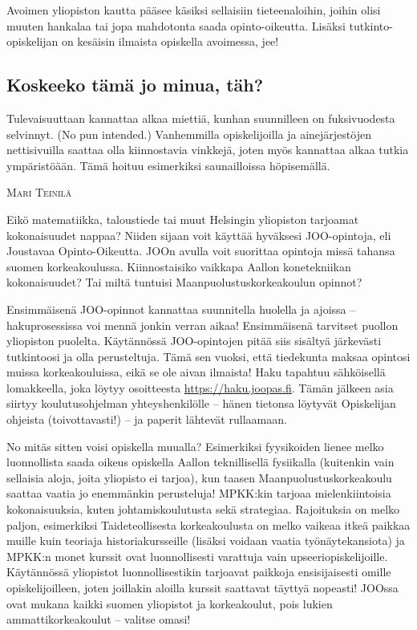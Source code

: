 \documentclass[a5paper, 8pt, twocolumn]{book} %
\numberwithin{equation}{section}
\begin{document}
Avoimen yliopiston kautta pääsee käsiksi
sellaisiin tieteenaloihin, joihin olisi
muuten hankalaa tai jopa mahdotonta saada
opinto-oikeutta. Lisäksi tutkinto-opiskelijan
on kesäisin ilmaista opiskella avoimessa,
jee!
\subsection*{Koskeeko tämä jo minua, täh?}
Tulevaisuuttaan kannattaa
alkaa miettiä, kunhan suunnilleen
on fuksivuodesta selvinnyt. (No pun intended.)
Vanhemmilla opiskelijoilla ja ainejärjestöjen
nettisivuilla saattaa olla kiinnostavia
vinkkejä, joten myös kannattaa alkaa
tutkia ympäristöään. Tämä hoituu esimerkiksi
saunailloissa höpisemällä.

\vspace{0.5cm}\noindent\textsc{Mari Teinilä}

Eikö matematiikka, taloustiede tai muut Helsingin
yliopiston tarjoamat kokonaisuudet nappaa? Niiden
sijaan voit käyttää hyväksesi JOO-opintoja, eli Joustavaa
Opinto-Oikeutta. JOOn avulla voit suorittaa opintoja
missä tahansa suomen korkeakoulussa. Kiinnostaisiko
vaikkapa Aallon konetekniikan kokonaisuudet? Tai miltä
tuntuisi Maanpuolustuskorkeakoulun opinnot?

Ensimmäisenä JOO-opinnot kannattaa
suunnitella huolella ja ajoissa -- hakuprosessissa
voi mennä jonkin verran aikaa!
Ensimmäisenä tarvitset puollon yliopiston
puolelta. Käytännössä JOO-opintojen pitää
siis sisältyä järkevästi tutkintoosi ja olla perusteltuja.
Tämä sen vuoksi, että tiedekunta
maksaa opintosi muissa korkeakouluissa,
eikä se ole aivan ilmaista! Haku tapahtuu
sähköisellä lomakkeella, joka löytyy osoitteesta
\url{https://haku.joopas.fi}. Tämän jälkeen asia
siirtyy koulutusohjelman yhteyshenkilölle -- hänen
tietonsa löytyvät Opiskelijan ohjeista
(toivottavasti!) -- ja paperit lähtevät rullaamaan.

No mitäs sitten voisi opiskella muualla?
Esimerkiksi fyysikoiden lienee melko
luonnollista saada oikeus opiskella
Aallon teknillisellä fysiikalla (kuitenkin vain sellaisia aloja,
joita yliopisto ei tarjoa), kun taasen
Maanpuolustuskorkeakoulu saattaa vaatia
jo enemmänkin perusteluja! MPKK:kin
tarjoaa mielenkiintoisia kokonaisuuksia,
kuten johtamiskoulutusta sekä strategiaa.
Rajoituksia on melko paljon, esimerkiksi
Taideteollisesta korkeakoulusta on melko
vaikeaa itkeä paikkaa muille kuin teoriaja
historiakursseille (lisäksi voidaan vaatia
työnäytekansiota) ja MPKK:n monet
kurssit ovat luonnollisesti varattuja vain upseeri\-opiskelijoille. Käytännössä yliopistot
luonnollisestikin tarjoavat paikkoja
ensisijaisesti omille opiskelijoilleen, joten
joillakin aloilla kurssit saattavat täyttyä
nopeasti! JOOssa ovat mukana kaikki suomen
yliopistot ja korkeakoulut, pois lukien
ammattikorkeakoulut -- valitse omasi!
\end{document}
